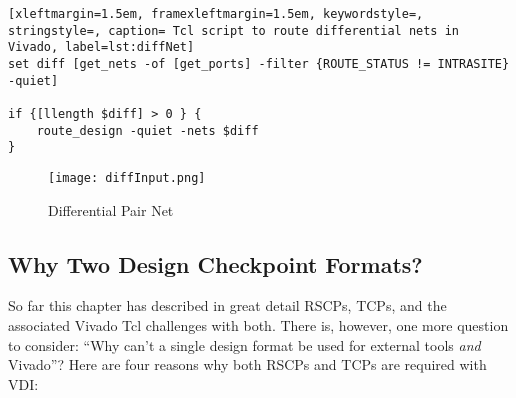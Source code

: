 \begin{lstlisting}[xleftmargin=1.5em, framexleftmargin=1.5em, keywordstyle=,
stringstyle=, caption= Tcl script to route differential nets in Vivado, label=lst:diffNet]
set diff [get_nets -of [get_ports] -filter {ROUTE_STATUS != INTRASITE} -quiet]

if {[llength $diff] > 0 } {
	route_design -quiet -nets $diff
}
\end{lstlisting}

\begin{figure}[t!]
  \centering
  \texttt{[image: diffInput.png]}
  \caption{Differential Pair Net}
  \label{fig:diffInput}
\end{figure}

\subsection{Why Two Design Checkpoint Formats?} \label{sec:twoFormats}
So far this chapter has described in great detail RSCPs, TCPs, and the
associated Vivado Tcl challenges with both. There is, however, one more
question to consider: ``Why can't a single design format be used for external
tools \textit{and} Vivado''? Here are four reasons why both RSCPs and TCPs are
required with VDI:

